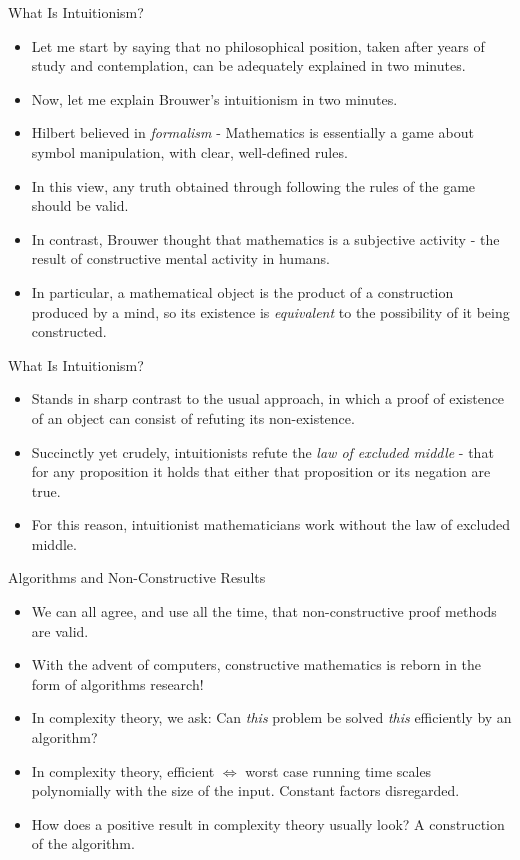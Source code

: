 \begin{frame}{What Is Intuitionism?}
\begin{itemize}
\item Let me start by saying that no philosophical position, taken after years of study and contemplation, can be adequately explained in two minutes.
\pause
\item Now, let me explain Brouwer's intuitionism in two minutes.
\pause
\item Hilbert believed in \emph{formalism} - Mathematics is essentially a game about symbol manipulation, with clear, well-defined rules.
\pause
\item In this view, any truth obtained through following the rules of the game should be valid. \pause
\item In contrast, Brouwer thought that mathematics is a subjective activity - the result of constructive mental activity in humans. \pause
\item In particular, a mathematical object is the product of a construction produced by a mind, so its existence is \emph{equivalent} to the possibility of it being constructed.
\end{itemize}
\end{frame}

\begin{frame}{What Is Intuitionism?}
\begin{itemize}
\item Stands in sharp contrast to the usual approach, in which a proof of existence of an object can consist of refuting its non-existence.
\pause
\item Succinctly yet crudely, intuitionists refute the \emph{law of excluded middle} - that for any proposition it holds that either that proposition or its negation are true. 
\pause
\item For this reason, intuitionist mathematicians work without the law of excluded middle.
\end{itemize}
\end{frame}

\begin{frame}{Algorithms and Non-Constructive Results}
   \begin{itemize}
   \item We can all agree, and use all the time, that non-constructive proof methods are valid. 
   \pause
   \item With the advent of computers, constructive mathematics is reborn in the form of algorithms research!
   \pause
   \item In complexity theory, we ask: Can \emph{this} problem be solved \emph{this} efficiently by an algorithm?
   \pause
   \item In complexity theory, efficient $\Leftrightarrow$ worst case running time scales polynomially with the size of the input. Constant factors disregarded. 
   \pause
   \item How does a positive result in complexity theory usually look? A construction of the algorithm.
   \end{itemize}
\end{frame}  

